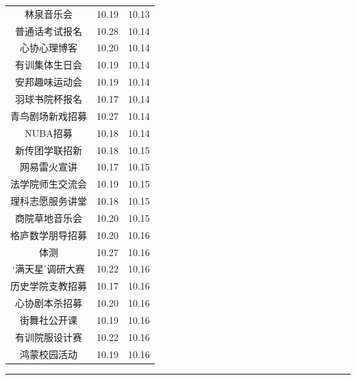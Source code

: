 \documentclass[letterpaper, 12pt]{article}
\begin{document}
\begin{multicols}{2}
{\begin{longtable}{|c|c|c|}
    林泉音乐会 & 10.19 & 10.13\\
    普通话考试报名 & 10.28 & 10.14\\
    心协心理博客 & 10.20 & 10.14\\
    有训集体生日会 & 10.19 & 10.14\\
    安邦趣味运动会 & 10.19 & 10.14\\
    羽球书院杯报名 & 10.17 & 10.14\\
    青鸟剧场新戏招募 & 10.27 & 10.14\\
    NUBA招募 & 10.18 & 10.14\\
    新传团学联招新 & 10.18 & 10.15\\
    网易雷火宣讲 & 10.17 & 10.15\\
    法学院师生交流会 & 10.19 & 10.15\\
    理科志愿服务讲堂 & 10.18 & 10.15\\
    商院草地音乐会 & 10.20 & 10.15\\
    格庐数学朋导招募 & 10.20 & 10.16\\
    体测 & 10.27 & 10.16\\
    ‘满天星’调研大赛 & 10.22 & 10.16\\
    历史学院支教招募 & 10.17 & 10.16\\
    心协剧本杀招募 & 10.20 & 10.16\\
    街舞社公开课 & 10.19 & 10.16\\
    有训院服设计赛 & 10.22 & 10.16\\
    鸿蒙校园活动 & 10.19 & 10.16\\
    
    \hline
\end{longtable}
\unskip
\unpenalty
\unpenalty}\unvbox\colbbox
\end{multicols}
\hrule
\pagebreak
\end{document}
